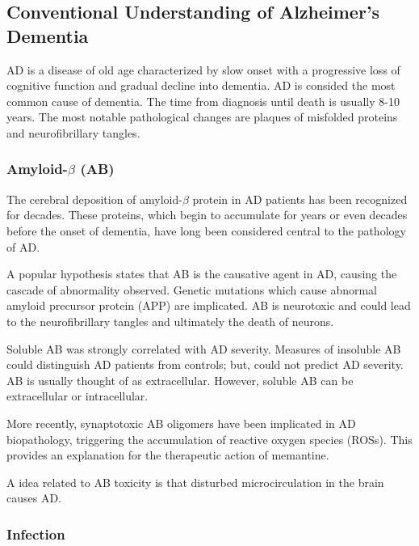 \documentclass[twocolumn]{article}
\begin{document}
\subsection{Conventional Understanding of Alzheimer's Dementia}

AD is a disease of old age
characterized by slow onset with a
progressive loss of cognitive function and gradual decline into dementia.
AD is consided the most common cause of dementia.
The time from diagnosis until death is usually 8-10 years.
The most notable pathological changes are plaques of misfolded proteins
and neurofibrillary tangles.

\subsubsection{Amyloid-$\beta$ (AB)}

The cerebral deposition of amyloid-$\beta$ protein in AD patients
has been recognized for decades.
These proteins, which begin to accumulate
for years or even decades before the onset of dementia,
 have long been considered central to the pathology of AD.
\cite{citron1992mutation}

A popular hypothesis states that AB is the causative agent in AD,
causing the cascade of abnormality observed. Genetic mutations
which cause abnormal amyloid precursor protein (APP) are implicated.
AB is neurotoxic and could lead to the neurofibrillary tangles
and ultimately the death of neurons.
\cite{hardy1992alzheimer}


Soluble AB was strongly correlated with AD severity.
Measures of insoluble AB could distinguish AD patients from
controls; but, could not predict AD severity.
AB is usually thought of as extracellular.
However, soluble AB can be extracellular or intracellular.
\cite{mclean1999soluble}


More recently, synaptotoxic AB oligomers have been implicated
in AD biopathology,
triggering the accumulation of reactive oxygen species (ROSs).
This provides an explanation for the therapeutic action
of memantine.
\cite{klein2013synaptotoxic}


A idea related to AB toxicity is that disturbed microcirculation in the brain
causes AD.
\cite{de1993can}


\subsubsection{Infection}
\end{document}

